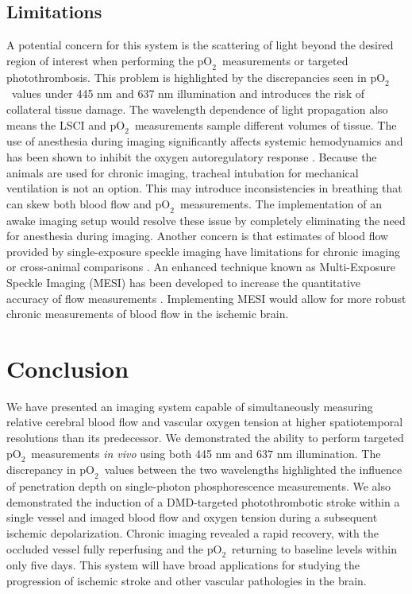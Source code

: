 \documentclass[12pt]{spieman}  %
\newcommand{\pO}{\ensuremath{\text{pO}_2}}
\begin{document}
\begin{spacing}{2}
\subsection{Limitations}
A potential concern for this system is the scattering of light beyond the desired region of interest when performing the \pO\ measurements or targeted photothrombosis. This problem is highlighted by the discrepancies seen in \pO\ values under 445 nm and 637 nm illumination and introduces the risk of collateral tissue damage. The wavelength dependence of light propagation also means the LSCI and \pO\ measurements sample different volumes of tissue. The use of anesthesia during imaging significantly affects systemic hemodynamics \cite{Janssen:2004ih} and has been shown to inhibit the oxygen autoregulatory response \cite{Aksenov:2012wh}. Because the animals are used for chronic imaging, tracheal intubation for mechanical ventilation is not an option. This may introduce inconsistencies in breathing that can skew both blood flow and \pO\ measurements. The implementation of an awake imaging setup \cite{Dombeck:2007gr} would resolve these issue by completely eliminating the need for anesthesia during imaging. Another concern is that estimates of blood flow provided by single-exposure speckle imaging have limitations for chronic imaging or cross-animal comparisons \cite{Kazmi:2013hp}. An enhanced technique known as Multi-Exposure Speckle Imaging (MESI) has been developed to increase the quantitative accuracy of flow measurements \cite{Parthasarathy:2008el}. Implementing MESI would allow for more robust chronic measurements of blood flow in the ischemic brain.


\section{Conclusion}
\label{sect:conclusion}
We have presented an imaging system capable of simultaneously measuring relative cerebral blood flow and vascular oxygen tension at higher spatiotemporal resolutions than its predecessor. We demonstrated the ability to perform targeted \pO\ measurements \textit{in vivo} using both 445 nm and 637 nm illumination. The discrepancy in \pO\ values between the two wavelengths highlighted the influence of penetration depth on single-photon phosphorescence measurements. We also demonstrated the induction of a DMD-targeted photothrombotic stroke within a single vessel and imaged blood flow and oxygen tension during a subsequent ischemic depolarization. Chronic imaging revealed a rapid recovery, with the occluded vessel fully reperfusing and the \pO\ returning to baseline levels within only five days. This system will have broad applications for studying the progression of ischemic stroke and other vascular pathologies in the brain.



\end{spacing}
\end{document}
